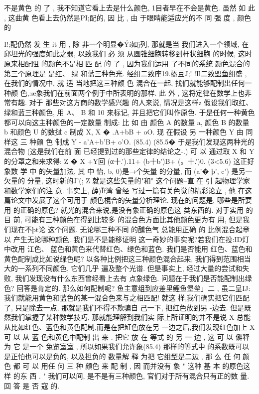 \documentclass[11pt,oneside]{book}
\begin{document}
\begin{common-format}
不是黄色 的 了 ,
我不知道它看上去是什么颜色,
1目者早在不会是黄色. 虽然 如 此 ,
这曲黄
色看上去仍然是PI;配的, 因 比 , 由 于眼睛能适应光的不 同 强 度 , 颜色的{I!;配仍然 发 生 it 用 , 除
非一个明显�Ýí如j列, 那就是当 我们进入一个领域, 在邱坦光的强度如此之弱, 以致我们 必 须
从圆锥细胞转移到杆状细胞 的时候, 这时原来相配阻 的颜色不是相 匹 配 的 了 , 因为我们运用
了不同的系统
颜色混合的第三个原理是
是红、 绿 和蓝三种色光.
经组二致座19.盔豆J;! !Il二致盟鱼组盛 , 在我们的情况中, 就
适 当地把这三种颜 色 混合在一起, 找们就能够配制出任何一种颜
色,:æ象我们在前面两个例于中所表明的那样. 此 外 , 这将定律在数学上也非常有趣. 对于
那些对这方商的数学感兴趣 的人来说, 情况是这样z 假设我们取红、 绿和蓝三种颜色, 用 A、
B 和 10 来标记, 并且把它们叫作原色. 于是任何一种黄色都可以向这主种颜色的一定数量
制成: 比 如 由 颜色 A 的数量 a, 颜色 B 的数量 b 和颜色 U 的数挝 c 制成 X,
X � .A+bB + oO.
现 在假设 另 一种颜色 Y 由 同样这 三 种颜 色 制成
Y - a'A+b'B+ o'O.
(85.4)
(85.5�
于是我们发现这两种光的混合物 (这是我们在前 面 已经提到过的那些定律的结论之-.) 可 以
通过取 X 和 Y 的分罩之和来求得:
Z � X +Y回 (α十.').11+ (b十b')B+ (。十.')0.
(3<5.6)
这正好象数 学 中 的矢量加法, 其 中 怡, b, 0)是→个矢量 的分量, 而 (a'� þ', c') 是另一欠量的
分量, 这时新的J'(; Z 就是这些矢量的"和"
这个问题--直 在 引 起物理学家和数学家们的注
意. 事实上, 薛)Îf湾 曾经 写过一篇有关色觉的精彩论立 , 他 在这篇论文中发展了这个可用于
颜色棍合的矢量分析理论.
现在的问题是, 哪些是所要用 的正确的原色? 就光的混合来说,是没有象正确的原色这
类东西的. 对于实用 的 目 前, 可能有三种颜色在得到比较多 的混合色方面比其他颜色更为有
用, 但是我们现在不þt论 这个问题. 无论哪三种不同 的醺色气 总能用正确 的 比例混合起章以
产生无论哪种颜色. 我们是不是能移证明 这一奇妙的事实呢?若我们在投:ID灯 中改用 江色、
蓝色和黄色来代替红色、绿色和蓝色. 我们是否能用 红色、蓝色和黄色配制成比如说绿色呢?
以各种比例把这三种颜色混合起来, 我们得到范围相当大的一系列不同颜色, 它们几乎
遍及整个光谱. 但是事实上, 经过大量的尝试和失败, 我们发现没有什么东西曾经看上去有
点象绿色. 问题在于我们是否能配制出绿色? 回答是肯定的. 那么如何配制呢?
鱼主意组到应差里鲤鱼堡垒」二 ,
虽二皇IJ:
我们就能用黄色和蓝色的某一混合色来与之相匹配! 就这
样,我们确实把它们匹配了, 只是除去一点, 那就是我们不得不欺骗自 己一下, 把红色放到另
-边去.
但是既然我们掌握了某种数学技巧, 那就能理解到我们实 际上所证明的并不是说
X 总能从比如红色、蓝色和黄色配制,而是在把缸色放在另 一边之后,我们发现红色加上 X
可 以 从 蓝 色和黄色中配制 出 来 . 把它 放 在 等式 的 另 一 边 , 这 可 以 僻释 为 它 是一个 兔览室室 ,
所以如果我们允许象(85.4) 那样的等式中 的系数既可以是正怕也可以是负的, 以及担负的
数量解 释 为把 它组型是二边 , 那 么 任 何 颜色 都 可 以 用任 何 三 种 颜色 来 配 制 , 因 而并没有 象
"
这种
基 本 的原色这 样 的东 西 .
"
我们可以间, 是不是有三种颜色, 官们对于所有混合只有正的数 量. 回 答 是 否 寇 的.

}
\end{common-format}
\end{document}

